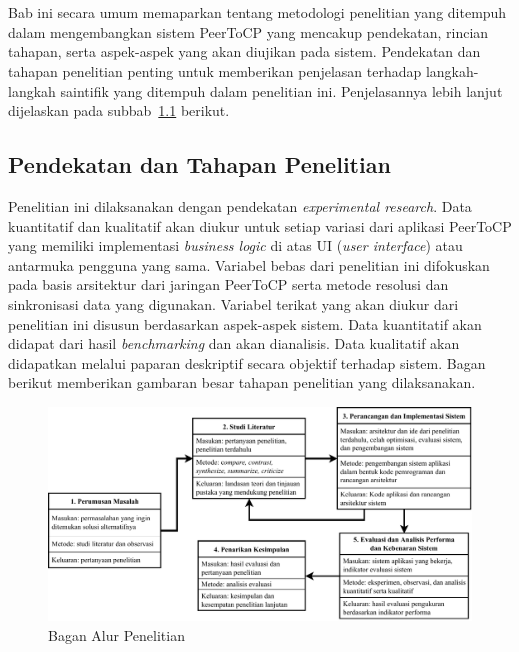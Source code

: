 \chapter{\babTiga}
\label{bab:3}

Bab ini secara umum memaparkan tentang metodologi penelitian yang ditempuh dalam mengembangkan sistem PeerToCP yang mencakup pendekatan, rincian tahapan, serta aspek-aspek yang akan diujikan pada sistem. Pendekatan dan tahapan penelitian penting untuk memberikan penjelasan terhadap langkah-langkah saintifik yang ditempuh dalam penelitian ini. Penjelasannya lebih lanjut dijelaskan pada subbab~\ref{sec:pendekatan} berikut.

\section{Pendekatan dan Tahapan Penelitian}
\label{sec:pendekatan}
Penelitian ini dilaksanakan dengan pendekatan \textit{experimental research}. Data kuantitatif dan kualitatif akan diukur untuk setiap variasi dari aplikasi PeerToCP yang memiliki implementasi \textit{business logic} di atas UI (\textit{user interface}) atau antarmuka pengguna yang sama. Variabel bebas dari penelitian ini difokuskan pada basis arsitektur dari jaringan PeerToCP serta metode resolusi dan sinkronisasi data yang digunakan. Variabel terikat yang akan diukur dari penelitian ini disusun berdasarkan aspek-aspek sistem. Data kuantitatif akan didapat dari hasil \textit{benchmarking} dan akan dianalisis. Data kualitatif akan didapatkan melalui paparan deskriptif secara objektif terhadap sistem. Bagan berikut memberikan gambaran besar tahapan penelitian yang dilaksanakan.

\begin{figure}
    \centering
    \includegraphics[scale=0.7]{assets/skripsi/Metode_Penelitian}
    \caption{Bagan Alur Penelitian}
    \label{bagan}
\end{figure}

